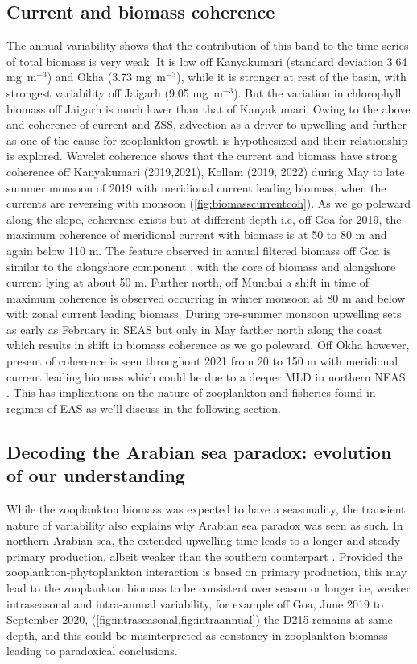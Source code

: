 \documentclass{article}
\begin{document}
	\subsection{Current and biomass coherence}
	The annual variability shows that the contribution of this band to the time series of total biomass is very weak. It is low off Kanyakumari (standard deviation 3.64 mg~m$^{-3}$) and Okha (3.73 mg~m$^{-3}$), while it is stronger at rest of the basin, with strongest variability off Jaigarh (9.05 mg~m$^{-3}$). But the variation in chlorophyll biomass off Jaigarh is much lower than that of Kanyakumari. Owing to the above and coherence of current and ZSS, advection as a driver to upwelling and further as one of the cause for zooplankton growth is hypothesized and their relationship is explored. Wavelet coherence shows that the current and biomass have strong coherence off Kanyakumari (2019,2021), Kollam (2019, 2022) during May to late summer monsoon of 2019 with meridional current leading biomass, when the currents are reversing with monsoon (\cref{fig:biomasscurrentcoh}). As we go poleward along the slope, coherence exists but at different depth i.e, off Goa for 2019, the maximum coherence of meridional current with biomass is at 50 to 80 m and again below 110 m. The feature observed in annual filtered biomass off Goa is similar to the alongshore component \citep{nethery2007zm}, with the core of biomass and alongshore current lying at about 50 m. Further north, off Mumbai a shift in time of maximum coherence is observed occurring in winter monsoon at 80 m and below with zonal current leading biomass. During pre-summer monsoon upwelling sets as early as February in SEAS but only in May farther north along the coast \citep{banse1968hydrography} which results in shift in biomass coherence as we go poleward. Off Okha however,  present of coherence is seen throughout 2021 from 20 to 150 m with meridional current leading biomass which could be due to a deeper MLD in northern NEAS \citep{marra2005jgofs,shankar2016inhibition}. This has implications on the nature of zooplankton and fisheries found in regimes of EAS as we'll discuss in the following section.

    \subsection{Decoding the Arabian sea paradox: evolution of our understanding}
	
	While the zooplankton biomass was expected to have a seasonality, the transient nature of variability also explains why Arabian sea paradox was seen as such. In northern Arabian sea, the extended upwelling time leads to a longer and steady primary production, albeit weaker than the southern counterpart \citep{madhupratap1996lack, smith2005mesozooplankton}. Provided the zooplankton-phytoplankton interaction is based on primary production, this may lead to the zooplankton biomass to be consistent over season or longer i.e, weaker intraseasonal and intra-annual variability, for example off Goa, June 2019 to September 2020, (\cref{fig:intraseasonal,fig:intraannual}) the D215 remains at same depth, and this could be misinterpreted as constancy in zooplankton biomass leading to paradoxical conclusions. 	 
	
\end{document}
